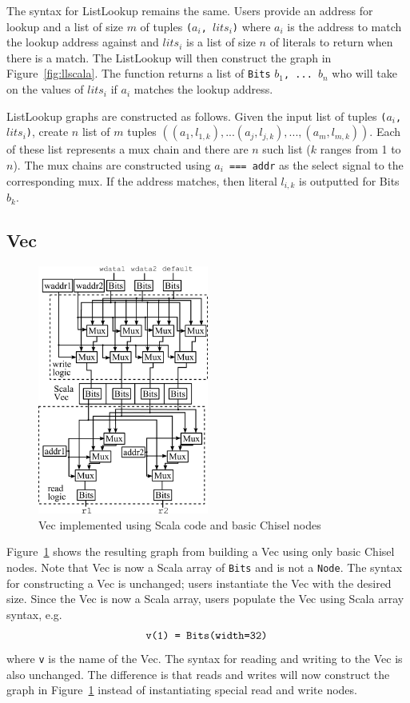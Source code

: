 The syntax for ListLookup remains the same. Users provide an address
for lookup and a list of size $m$ of tuples {\tt ($a_i$, $lits_i$)}
where {\tt $a_i$} is the address to match the lookup address against and
{\tt $lits_i$} is a list of size $n$ of literals to return when there
is a match. The ListLookup will then construct the graph in
Figure~\ref{fig:llscala}. The function returns a list of {\tt Bits}
{\tt $b_1$, ... $b_n$} who will take on the values of {\tt $lits_i$} if
{\tt $a_i$} matches the lookup address.

ListLookup graphs are constructed as follows. Given the input list of
tuples {\tt ($a_i$, $lits_i$)}, create $n$ list of $m$ tuples
{\tt $( (a_1, l_{1, k}), ... (a_j, l_{j, k}), ..., (a_m, l_{m, k})
  )$}. Each of these list represents a mux chain and there are $n$
such list ($k$ ranges from 1 to $n$). The mux chains are constructed
using {\tt $a_i$ === addr} as the select signal to the corresponding
mux. If the address matches, then literal {\tt $l_{i, k}$} is outputted
for Bits $b_k$.

\subsection{Vec}
\begin{figure}[htb]
\centering
\includegraphics[width=0.5\textwidth]{figures/vecscala.pdf}
\caption{Vec implemented using Scala code and basic Chisel nodes}
\label{fig:vecscala}
\end{figure}

Figure~\ref{fig:vecscala} shows the resulting graph from building a
Vec using only basic Chisel nodes. Note that Vec is now a Scala array
of {\tt Bits} and is not a {\tt Node}. The syntax for constructing a
Vec is unchanged; users instantiate the Vec with the desired
size. Since the Vec is now a Scala array, users populate the Vec using
Scala array syntax, e.g.
\begin{align*}
  \text{ \tt{v(1) = Bits(width=32)} }
\end{align*}
where {\tt v} is the name of the Vec. The syntax for reading and
writing to the Vec is also unchanged. The difference is that reads
and writes will now construct the graph in Figure~\ref{fig:vecscala}
instead of instantiating special read and write nodes.

